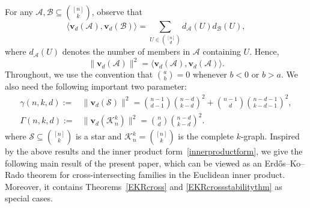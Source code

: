 \documentclass[10pt,a4paper]{amsart}
\numberwithin{equation}{section}
\def\A{\mathcal{A}}
\def\B{\mathcal{B}}
\def\S{\mathcal{S}}
\begin{document}
For any $\A,\B\subseteq \binom{[n]}{k}$, observe that
\begin{equation}\label{innerproductform}
\big\langle \mathbf{v}_d(\A),\mathbf{v}_d(\B)\big\rangle
=\sum_{U\in \binom{[n]}{d}}
d_{\A}(U) d_{\B}(U),
\end{equation}
where $d_\mathcal{\A}(U)$ denotes the number of members in $\A$ containing $U$.
Hence,
\[
\|\mathbf{v}_{d}(\A)\|^2
=\big\langle\mathbf{v}_d(\A),\mathbf{v}_d(\A)\big\rangle.
\]
Throughout, we use the convention that $\binom{a}{b}=0$ whenever
$b<0$ or $b>a$.
We also need the following important two parameter:
\begin{align*}
\gamma(n,k,d):=&\|\mathbf{v}_{d}(\S)\|^2=
\binom{n-1}{d-1}\binom{n-d}{k-d}^{2}
+\binom{n-1}{d}\binom{n-d-1}{k-d-1}^{2},\\
\Gamma(n,k,d):= &\|\mathbf{v}_{d}(\mathcal{K}_n^k)\|^2=
\binom {n}{d}\binom{n-d}{k-d}^{2}.
\end{align*}
where $\S\subseteq \binom{[n]}{k}$ is a star and $\mathcal{K}_n^k=\binom{[n]}{k}$ is  the complete $k$-graph.
Inspired by the above results and the inner product form~\eqref{innerproductform},
we give the following main result of the present paper,
which can be viewed as an Erd\H{o}s--Ko--Rado theorem for cross-intersecting families in the Euclidean inner product.
Moreover, it contains Theorems~\ref{EKRcross} and \ref{EKRcrossstabilitythm} as special cases.
\end{document}

